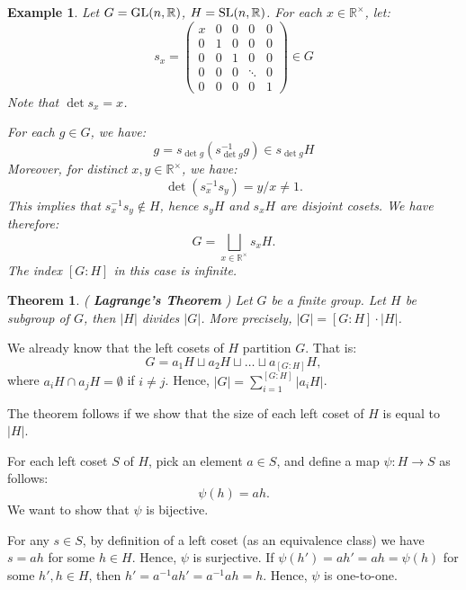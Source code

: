 \documentclass[a4paper,12pt]{report}
\newcommand{\abs}[1]{\left|#1\right|}
\newcommand{\ra}{\longrightarrow}
\newcounter{statement}
\numberwithin{statement}{chapter}
\newtheorem{thm}[statement]{Theorem}
\newtheorem{eg}[statement]{\bf Example}
\numberwithin{equation}{chapter}
\numberwithin{section}{chapter}
\numberwithin{subsection}{section}
\begin{document}
\begin{eg}
Let $G = {\rm GL}(n, \mathbb{R})$, $H = {\rm SL}(n, \mathbb{R})$.
For each $x \in \mathbb{R}^\times$, let:
\[
s_x = \left(
\begin{matrix}
x & 0 & 0& 0 & 0\\
0&1 &0 &0 &0\\
0&0 &1 &0 &0\\
0&0 &0 &\ddots&0\\
0& 0 &0 &0 &1
\end{matrix}
\right) \in G
\]
Note that $\det s_x = x$.



For each $g \in G$, we have:
\[
g = s_{\det g}{(s_{\det g}^{-1} g)} \in s_{\det g}H
\]
Moreover, for distinct $x, y \in \mathbb{R}^\times$, we have:
\[
\det (s_x^{-1}s_y) = y/x \neq 1.
\]
This implies that $s_x^{-1} s_y \notin H$, hence $s_yH$ and $s_xH$ are disjoint cosets.
We have therefore:
\[
G = \bigsqcup_{x \in \mathbb{R}^\times} s_x H.
\]
The index $[G: H]$ in this case is infinite.
\end{eg}








\begin{thm}
( {\bf Lagrange's Theorem} )
Let $G$ be a finite group.  Let $H$ be subgroup of $G$, then $\abs{H}$ divides $\abs{G}$.
More precisely, $\abs{G} = [G : H]\cdot\abs{H}$.
\end{thm}



We already know that the left cosets of $H$ partition $G$.
That is:
\[
G = a_1 H \sqcup a_2 H \sqcup \ldots \sqcup a_{[G:H]}H,
\]
where $a_i H \cap a_j H = \emptyset$ if $i \neq j$.
Hence, $\abs{G} = \sum_{i = 1}^{[G:H]} \abs{a_i H}$.

The theorem follows if we show that the size of each left coset of $H$ is equal to $\abs{H}$.



For each left coset $S$ of $H$, pick an element $a \in S$, and  define a map $\psi : H \ra S$ as follows:
\[
\psi(h) = ah.
\]
We want to show that $\psi$ is bijective.



For any $s \in S$,
by definition of a left coset (as an equivalence class) we have $s = ah$ for some $h \in H$.
Hence, $\psi$ is surjective.
If $\psi(h') = ah' = ah = \psi(h)$ for some $h', h \in H$,
then $h' = a^{-1}ah' = a^{-1}ah = h$.  Hence, $\psi$ is one-to-one.
\end{document}
